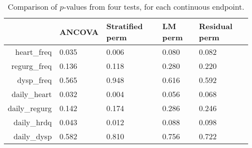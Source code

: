 \begin{table}[ht]
\centering
\begin{tabular}{r|p{1in}p{1in}p{1in}p{1in}}
  \hline
 & ANCOVA & Stratified perm & LM perm & Residual perm \\ 
  \hline
heart\_freq & 0.035 & 0.006 & 0.080 & 0.082 \\ 
  regurg\_freq & 0.136 & 0.118 & 0.280 & 0.220 \\ 
  dysp\_freq & 0.565 & 0.948 & 0.616 & 0.592 \\ 
  daily\_heart & 0.032 & 0.004 & 0.056 & 0.068 \\ 
  daily\_regurg & 0.142 & 0.174 & 0.286 & 0.246 \\ 
  daily\_hrdq & 0.043 & 0.012 & 0.088 & 0.098 \\ 
  daily\_dysp & 0.582 & 0.810 & 0.756 & 0.722 \\ 
   \hline
\end{tabular}
\caption{Comparison of $p$-values from four tests, for each continuous endpoint.} 
\label{tab:clinical_pvalues}
\end{table}
